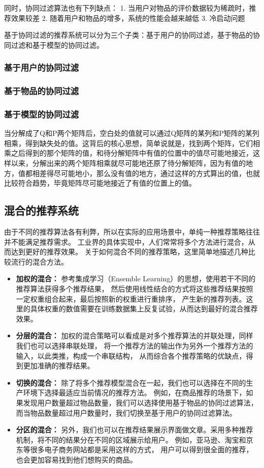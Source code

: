 同时，协同过滤算法也有下列缺点：
1. 当用户对物品的评价数据较为稀疏时，推荐效果较差
2. 随着用户和物品的增多，系统的性能会越来越低
3. 冷启动问题



基于协同过滤的推荐系统可以分为三个子类：基于用户的协同过滤，基于物品的协同过滤和基于模型的协同过滤。
\subsubsection{基于用户的协同过滤}
\subsubsection{基于物品的协同过滤}
\subsubsection{基于模型的协同过滤}
当分解成了Q和P两个矩阵后，空白处的值就可以通过Q矩阵的某列和P矩阵的某列相乘，得到缺失处的值。这背后的核心思想，简单说就是，找到两个矩阵，它们相乘之后得到的那个矩阵的值，和待分解矩阵中有值的位置中的值尽可能地接近，这样以来，分解出来的两个矩阵相乘就尽可能地还原了待分解矩阵，因为有值的地方，值都相差得尽可能地小，那么没有值的地方，通过这样的方式算出的值，也就比较符合趋势，毕竟矩阵尽可能地接近了有值的位置上的值。



\subsection{混合的推荐系统}
由于不同的推荐算法各有利弊，所以在实际的应用场景中，单纯一种推荐策略往往并不能满足推荐需求。
工业界的具体实现中，人们常常将多个方法进行混合，从而达到更好的推荐效果。
关于如何混合不同的推荐策略，这里简单地描述几种比较流行的混合方法。
\begin{itemize}
\item \textbf{加权的混合：}
参考集成学习（Ensemble Learning）的思想，使用若干不同的推荐算法获得多个推荐结果，
然后使用线性结合的方式将这些推荐结果按照一定权重组合起来，最后按照新的权重进行重排序，
产生新的推荐列表。这里的具体权重的数值需要在训练数据集上反复试验，从而达到最好的混合推荐效果。
\item \textbf{分层的混合：}
加权的混合策略可以看成是对多个推荐算法的并联处理，同样我们也可以选择串联处理，
将一个推荐方法的输出作为另外一个推荐方法的输入，以此类推，构成一个串联结构，
从而综合各个推荐策略的优缺点，得到更加准确的推荐结果。
\item \textbf{切换的混合：}
除了将多个推荐模型混合在一起，我们也可以选择在不同的生产环境下选择最适应当前情况的推荐方法。
例如，在商品推荐的场景下，如果发现用户数量超过物品数量，我们可以选择使用基于物品的协同过滤算法，
而当物品数量超过用户数量时，我们切换至基于用户的协同过滤算法。
\item \textbf{分区的混合：}
另外，我们也可以在推荐结果展示界面做文章。采用多种推荐机制，将不同的结果分在不同的区域展示给用户。
例如，亚马逊、淘宝和京东等很多电子商务网站都是采用这样的方式，
用户可以得到很全面的推荐，也会更加容易找到他们想购买的商品。
\end{itemize}


